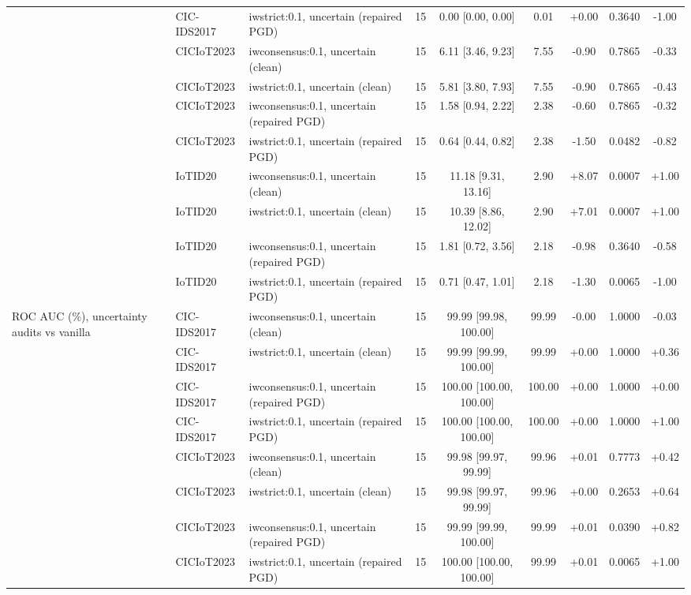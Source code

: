 \begin{table}[t]
\begin{tabular}{lllcccccc}
 & CIC-IDS2017 & iwstrict:0.1, uncertain (repaired PGD) & 15 & 0.00 [0.00, 0.00] & 0.01 & +0.00 & 0.3640 & -1.00 \\
 & CICIoT2023 & iwconsensus:0.1, uncertain (clean) & 15 & 6.11 [3.46, 9.23] & 7.55 & -0.90 & 0.7865 & -0.33 \\
 & CICIoT2023 & iwstrict:0.1, uncertain (clean) & 15 & 5.81 [3.80, 7.93] & 7.55 & -0.90 & 0.7865 & -0.43 \\
 & CICIoT2023 & iwconsensus:0.1, uncertain (repaired PGD) & 15 & 1.58 [0.94, 2.22] & 2.38 & -0.60 & 0.7865 & -0.32 \\
 & CICIoT2023 & iwstrict:0.1, uncertain (repaired PGD) & 15 & 0.64 [0.44, 0.82] & 2.38 & -1.50 & 0.0482 & -0.82 \\
 & IoTID20 & iwconsensus:0.1, uncertain (clean) & 15 & 11.18 [9.31, 13.16] & 2.90 & +8.07 & 0.0007 & +1.00 \\
 & IoTID20 & iwstrict:0.1, uncertain (clean) & 15 & 10.39 [8.86, 12.02] & 2.90 & +7.01 & 0.0007 & +1.00 \\
 & IoTID20 & iwconsensus:0.1, uncertain (repaired PGD) & 15 & 1.81 [0.72, 3.56] & 2.18 & -0.98 & 0.3640 & -0.58 \\
 & IoTID20 & iwstrict:0.1, uncertain (repaired PGD) & 15 & 0.71 [0.47, 1.01] & 2.18 & -1.30 & 0.0065 & -1.00 \\
ROC AUC (\%), uncertainty audits vs vanilla & CIC-IDS2017 & iwconsensus:0.1, uncertain (clean) & 15 & 99.99 [99.98, 100.00] & 99.99 & -0.00 & 1.0000 & -0.03 \\
 & CIC-IDS2017 & iwstrict:0.1, uncertain (clean) & 15 & 99.99 [99.99, 100.00] & 99.99 & +0.00 & 1.0000 & +0.36 \\
 & CIC-IDS2017 & iwconsensus:0.1, uncertain (repaired PGD) & 15 & 100.00 [100.00, 100.00] & 100.00 & +0.00 & 1.0000 & +0.00 \\
 & CIC-IDS2017 & iwstrict:0.1, uncertain (repaired PGD) & 15 & 100.00 [100.00, 100.00] & 100.00 & +0.00 & 1.0000 & +1.00 \\
 & CICIoT2023 & iwconsensus:0.1, uncertain (clean) & 15 & 99.98 [99.97, 99.99] & 99.96 & +0.01 & 0.7773 & +0.42 \\
 & CICIoT2023 & iwstrict:0.1, uncertain (clean) & 15 & 99.98 [99.97, 99.99] & 99.96 & +0.00 & 0.2653 & +0.64 \\
 & CICIoT2023 & iwconsensus:0.1, uncertain (repaired PGD) & 15 & 99.99 [99.99, 100.00] & 99.99 & +0.01 & 0.0390 & +0.82 \\
 & CICIoT2023 & iwstrict:0.1, uncertain (repaired PGD) & 15 & 100.00 [100.00, 100.00] & 99.99 & +0.01 & 0.0065 & +1.00 \\

\end{tabular}
\end{table}
